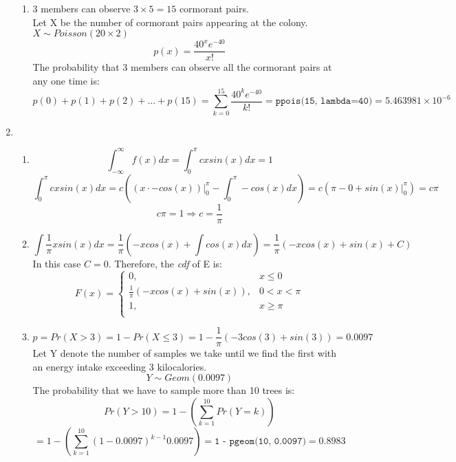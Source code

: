 \documentclass[11pt]{article}
\begin{document}
\begin{enumerate}[label=\textbf{Question \arabic*:},start=1]
\begin{enumerate}
\item 
3 members can observe $3 \times 5 = 15$ cormorant pairs.\\
Let X be the number of cormorant pairs appearing at the colony. \( X \sim Poisson(20 \times 2) \) \\
\[
p(x) = \frac{40^x e^{-40}}{x!}
\]
The probability that 3 members can observe all the cormorant pairs at any one time is:
\[
p(0) + p(1) + p(2) + ... + p(15) = \sum_{k=0}^{15} \frac{40^k e^{-40}}{k!} = \texttt{ppois(15, lambda=40)} = 5.463981 \times 10^{-6}
\]

\end{enumerate}




\item 
\begin{enumerate}
  \item 
\[
\int_{-\infty}^{\infty} f(x) dx = \int_{0}^{\pi} cx sin(x) dx = 1
\]
\[
 \int_{0}^{\pi} cx sin(x) dx = c( (x \cdot -cos(x))|_{0}^{\pi} - \int_{0}^{\pi} -cos(x)dx ) = c (\pi - 0 + sin(x) |_{0}^{\pi}) = c \pi
\]
\[
c \pi = 1 \Rightarrow c = \frac{1}{\pi}
\]

  \item 
\[
 \int \frac{1}{\pi} x sin(x) dx = \frac{1}{\pi}( -xcos(x) + \int cos(x)dx ) = \frac{1}{\pi} (-xcos(x) + sin(x) + C)
\]
In this case $C = 0$. Therefore, the \textit{cdf} of E is:
\[
F(x) = \begin{cases}
        0, & x \leq 0\\
        \frac{1}{\pi} (-xcos(x) + sin(x)), & 0 < x < \pi\\
        1, & x \ge \pi\\
        \end{cases}
\]


  \item 
\[
p = Pr(X > 3) = 1 - Pr(X \leq 3) = 1 - \frac{1}{\pi}(-3 cos(3) + sin(3)) = 0.0097
\]
Let Y denote the number of samples we take until we find the first with an energy intake exceeding 3 kilocalories. \\
\[
Y \sim Geom(0.0097)
\]
The probability that we have to sample more than 10 trees is:
\[
Pr(Y > 10) = 1 - (\sum_{k=1}^{10} Pr(Y = k) )
\]
\[
= 1 - (\sum_{k=1}^{10} (1-0.0097)^{k-1} 0.0097) = \texttt{1 - pgeom(10, 0.0097)} = 0.8983
\]



\end{enumerate}

\end{enumerate}
\end{document}
